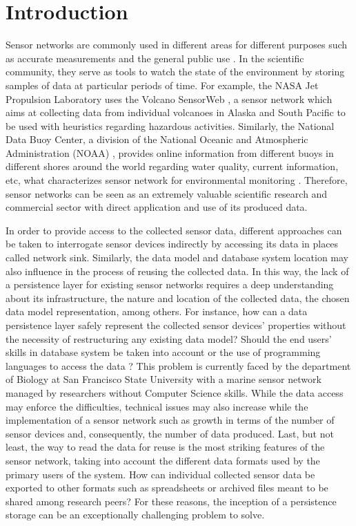 


\chapter{Introduction}

Sensor networks are commonly used in different areas for different purposes
such as accurate measurements and the general public use \cite{sn-intro01}
\cite{sn-intro02}. In the scientific community, they serve as tools to watch
the state of the environment by storing samples of data at particular periods
of time. For example, the NASA Jet Propulsion Laboratory uses the Volcano
SensorWeb \cite{sn-ex02}, a sensor network which aims at collecting data from
individual volcanoes in Alaska and South Pacific to be used with heuristics
regarding hazardous activities. Similarly, the National Data Buoy Center, a
division of the National Oceanic and Atmospheric Administration (NOAA)
\cite{sn-ex03}, provides online information from different buoys in different
shores around the world regarding water quality, current information, etc,
what characterizes sensor network for environmental monitoring \cite{sn-ex01}.
Therefore, sensor networks can be seen as an extremely valuable scientific
research and commercial sector with direct application and use of its produced
data.

In order to provide access to the collected sensor data, different approaches
can be taken to interrogate sensor devices indirectly by accessing its data in
places called network sink. Similarly, the data model and database system
location may also influence in the process of reusing the collected data. In
this way, the lack of a persistence layer for existing sensor networks requires
a deep understanding about its infrastructure, the nature and location of the
collected data, the chosen data model representation, among others. For
instance, how can a data persistence layer safely represent the collected
sensor devices' properties without the necessity of restructuring any existing
data model? Should the end users' skills in database system be taken into
account or the use of programming languages to access the data
\cite{sn-programming-language}? This problem is currently faced by the
department of Biology at San Francisco State University with a marine sensor
network managed by researchers without Computer Science skills. While the data
access may enforce the difficulties, technical issues may also increase while
the implementation of a sensor network such as growth in terms of the number of
sensor devices and, consequently, the number of data produced. Last, but not
least, the way to read the data for reuse is the most striking features of the
sensor network, taking into account the different data formats used by the
primary users of the system. How can individual collected sensor data be
exported to other formats such as spreadsheets or archived files meant to be
shared among research peers? For these reasons, the inception of a persistence
storage can be an exceptionally challenging problem to solve.

